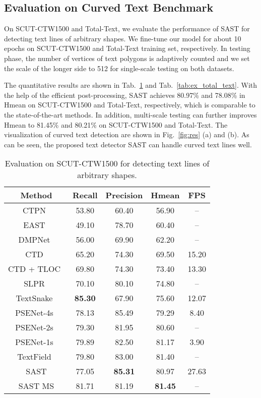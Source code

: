 \documentclass[sigconf]{acmart}
\begin{document}
\subsection{Evaluation on Curved Text Benchmark}
On SCUT-CTW1500 and Total-Text, we evaluate the performance of SAST for detecting text lines of arbitrary shapes. We fine-tune our model for about 10 epochs on SCUT-CTW1500 and Total-Text training set, respectively. 
In testing phase, the number of vertices of text polygons is adaptively counted and we set the scale of the longer side to 512 for single-scale testing on both datasets.

The quantitative results are shown in Tab.~\ref{tab:ex_ctw1500} and Tab.~\ref{tab:ex_total_text}. With the help of the efficient post-processing, SAST achieves 80.97\% and 78.08\% in Hmean on SCUT-CTW1500 and Total-Text, respectively, which is comparable to the state-of-the-art methods. In addition, multi-scale testing can further improves Hmean to 81.45\% and 80.21\% on SCUT-CTW1500 and Total-Text. The visualization of curved text detection are shown in Fig.~\ref{fig:res} (a) and (b). As can be seen, the proposed text detector SAST can handle curved text lines well.

\begin{table}
  \caption{Evaluation on SCUT-CTW1500 for detecting text lines of arbitrary shapes.}
  \label{tab:ex_ctw1500}
  \begin{tabular}{ccccc}
    \toprule
      Method & Recall & Precision & Hmean  &FPS \\
    \midrule
    CTPN~\cite{tian2016detecting} &53.80 &60.40 &56.90 &--\\
    EAST~\cite{zhou2017east} &49.10 &78.70 &60.40 &--\\
    DMPNet~\cite{liu2017deep} &56.00 &69.90 &62.20 &--\\
    CTD~\cite{yuliang2017detecting} &65.20 &74.30 &69.50 &15.20\\
    CTD + TLOC~\cite{yuliang2017detecting} &69.80 &74.30 &73.40 &13.30\\
    SLPR~\cite{zhu2018sliding} &70.10 &80.10 &74.80 &--\\
    TextSnake~\cite{long2018textsnake}  &\textbf{85.30} &67.90 &75.60 &12.07\\
PSENet-4s~\cite{wang2019shape} &78.13 &85.49 &79.29 &8.40 \\
    PSENet-2s~\cite{wang2019shape} &79.30 &81.95 &80.60 &-- \\
PSENet-1s~\cite{wang2019shape} &79.89 &82.50 &81.17 &3.90\\
    TextField~\cite{xu2019textfield} &79.80 &83.00 &81.40 &--\\
\midrule
    SAST  &77.05 	&\textbf{85.31} 	&80.97  &27.63\\
    SAST MS &81.71 	&81.19 	&\textbf{81.45}  &--\\

  \bottomrule
\end{tabular}
\end{table}
\end{document}
